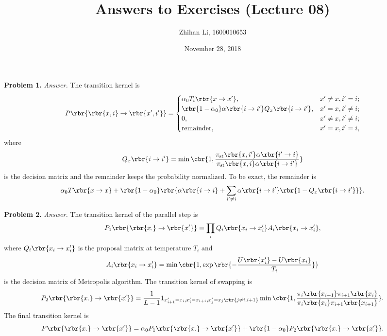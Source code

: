 \documentclass[english, nochinese]{pnote}
\title{Answers to Exercises (Lecture 08)}
\author{Zhihan Li, 1600010653}
\date{November 28, 2018}
\begin{document}
\maketitle

\textbf{Problem 1.} \textit{Answer.} The transition kernel is
\begin{equation}
P \rbr{ \rbr{ x, i } \rightarrow \rbr{ x', i' } } =
\begin{cases}
\alpha_0 T_i \rbr{ x \rightarrow x' }, & x' \neq x, i' = i; \\
\rbr{ 1 - \alpha_0 } \alpha \rbr{ i \rightarrow i' } Q_x \rbr{ i \rightarrow i' }, & x' = x, i' \neq i; \\
0, & x' \neq x, i' \neq i; \\
\text{remainder}, & x' = x, i' = i,
\end{cases}
\end{equation}
where
\begin{equation}
Q_x \rbr{ i \rightarrow i' } = \min \cbr{ 1, \frac{ \pi_{\text{st}} \rbr{ x, i' } \alpha \rbr{ i' \rightarrow i } }{ \pi_{\text{st}} \rbr{ x, i } \alpha \rbr{ i \rightarrow i' } } }
\end{equation}
is the decision matrix and the remainder keeps the probability normalized. To be exact, the remainder is
\begin{equation}
\alpha_0 T \rbr{ x \rightarrow x } + \rbr{ 1 - \alpha_0  } \rbr{ \alpha \rbr{ i \rightarrow i } + \sum_{ i' \neq i } \alpha \rbr{ i \rightarrow i' } \rbr{ 1 - Q_x \rbr{ i \rightarrow i' } } }.
\end{equation}

\textbf{Problem 2.} \textit{Answer.} The transition kernel of the parallel step is
\begin{equation}
P_1 \rbr{ \rbr{x_{\cdot}} \rightarrow \rbr{x'_{\cdot}} } = \prod_i Q_i \rbr{ x_i \rightarrow x'_i } A_i \rbr{ x_i \rightarrow x'_i },
\end{equation}
where $ Q_i \rbr{ x_i \rightarrow x'_i } $ is the proposal matrix at temperature $T_i$ and
\begin{equation}
    A_i \rbr{ x_i \rightarrow x'_i } = \min \cbr{ 1, \exp \rbr{ - \frac{ U \rbr{x'_i} - U \rbr{x_i} }{T_i} } }
\end{equation}
is the decision matrix of Metropolis algorithm. The transition kernel of swapping is
\begin{equation}
P_2 \rbr{ \rbr{x_{\cdot}} \rightarrow \rbr{x'_{\cdot}} } = \frac{1}{ L - 1 } 1_{ x'_{ i + 1 } = x_i, x'_i = x_{ i + 1 }, x'_j = x_j \rbr{ j \neq i, i + 1 } } \min \cbr{ 1, \frac{ \pi_i \rbr{x_{ i + 1 }} \pi_{ i + 1 } \rbr{x_i} }{ \pi_i \rbr{x_i} \pi_{ i + 1 } \rbr{x_{ i + 1 }} } }.
\end{equation}
The final transition kernel is
\begin{equation}
P \rbr{ \rbr{x_{\cdot}} \rightarrow \rbr{x'_{\cdot}} } = \alpha_0 P_1 \rbr{ \rbr{x_{\cdot}} \rightarrow \rbr{x'_{\cdot}} } + \rbr{ 1 - \alpha_0 } P_2 \rbr{ \rbr{x_{\cdot}} \rightarrow \rbr{x'_{\cdot}} }.
\end{equation}
\end{document}
